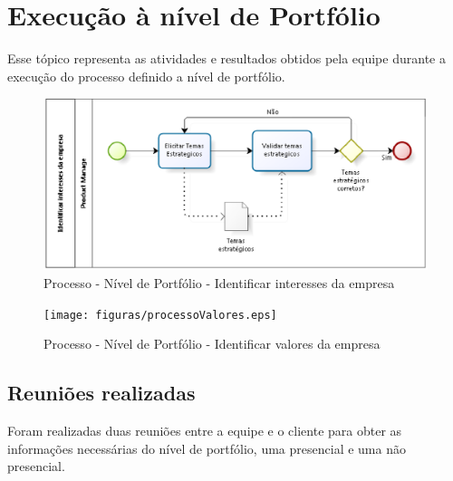 \chapter[Execução à nível de Portfólio]{Execução à nível de Portfólio}
Esse tópico representa as atividades e resultados obtidos pela equipe durante a execução do processo definido a nível de portfólio.

\begin{figure}[H]
    \centering
    \label{identificarInteresse}
    \includegraphics[keepaspectratio=true,scale=0.6]{figuras/processoInteresses.eps}
    \caption[Identificar interesses da empresa]{Processo - Nível de Portfólio - Identificar interesses da empresa}
\end{figure}

\begin{figure}[H]
    \centering
    \label{identificarInteresse}
    \texttt{[image: figuras/processoValores.eps]}
    \caption[Identificar valores da empresa]{Processo - Nível de Portfólio - Identificar valores da empresa}
\end{figure}

\section{Reuniões realizadas}
Foram realizadas duas reuniões entre a equipe e o cliente para obter as informações necessárias do nível de portfólio, uma presencial e uma não presencial.
